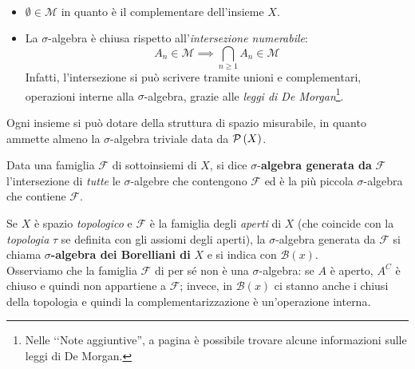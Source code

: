 \begin{observe}~{}
	\begin{itemize}
		\item $\emptyset\in\mathcal{M}$ in quanto è il complementare dell'insieme $X$.
		\item La $\sigma$-algebra è chiusa rispetto all'\textit{intersezione numerabile}:
		\begin{equation*}
			A_n\in\mathcal{M}\implies \bigcap_{n\geq 1}A_n\in\mathcal{M} 
		\end{equation*}
		Infatti, l'intersezione si può scrivere tramite unioni e complementari, operazioni interne alla $\sigma$-algebra, grazie alle \textit{leggi di De Morgan}\footnote{Nelle ‘‘Note aggiuntive'', a pagina \pageref{leggidemorgan} è possibile trovare alcune informazioni sulle leggi di De Morgan.}.
	\end{itemize}
\end{observe}
\begin{example}
	Ogni insieme si può dotare della struttura di spazio misurabile, in quanto ammette almeno la $\sigma$-algebra triviale data da $\mathcal{P}\left(X\right)$.
\end{example}
\begin{define}
	Data una famiglia $\mathcal{F}$ di sottoinsiemi di $X$, si dice $\sigma$-\textbf{algebra generata da} $\mathcal{F}$ l'intersezione di \textit{tutte} le $\sigma$-algebre che contengono $\mathcal{F}$ ed è la più piccola $\sigma$-algebra che contiene $\mathcal{F}$.
\end{define}
\begin{example}
	Se $X$ è spazio \textit{topologico} e $\mathcal{F}$ è la famiglia degli \textit{aperti} di $X$ (che coincide con la \textit{topologia} $\tau$ se definita con gli assiomi degli aperti), la $\sigma$-algebra generata da $\mathcal{F}$ si chiama $\sigma$\textbf{-algebra dei Borelliani di} $X$ e si indica con $\mathcal{B}(x)$.\\
	Osserviamo che la famiglia $\mathcal{F}$ di per sé non è una $\sigma$-algebra: se $A$ è aperto, $A^C$ è chiuso e quindi non appartiene a $\mathcal{F}$; invece, in $\mathcal{B}(x)$ ci stanno anche i chiusi della topologia e quindi la complementarizzazione è un'operazione interna.
\end{example}
